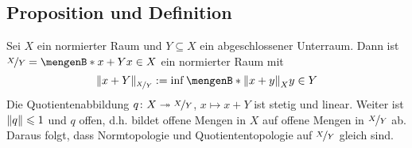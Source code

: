 \subsection[Proposition und Definition: Norm auf dem Quotientenraum]{Proposition und Definition} %
\label{sub:213}
Sei $X$ ein normierter Raum und $Y \subseteq X$ ein abgeschlossener Unterraum. Dann ist $\nicefrac{X}{Y} = \set[x +Y]{x \in X}$ ein normierter Raum mit
\[
	\norm[\nicefrac{X}{Y}]{x +Y} := \inf \set[{\norm[X]{x+y} }]{y \in Y}  
\]
Die Quotientenabbildung $q \colon X \twoheadrightarrow \nicefrac{X}{Y}$, $x \mapsto x+ Y$ ist stetig und linear. Weiter ist $\norm{q} \le 1$ und $q$ offen, d.h. bildet offene Mengen 
in $X$ auf offene Mengen in $\nicefrac{X}{Y}$ ab.
Daraus folgt, dass Normtopologie und Quotiententopologie auf $\nicefrac{X}{Y}$ gleich sind.
